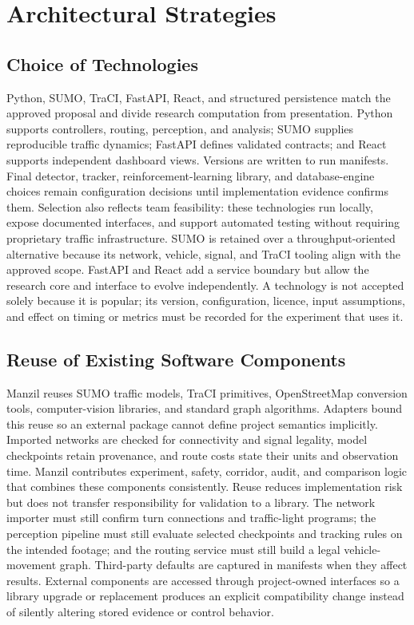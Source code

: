 \section{Architectural Strategies}

\subsection{Choice of Technologies}

Python, SUMO, TraCI, FastAPI, React, and structured persistence match the approved proposal and divide research computation from presentation. Python supports controllers, routing, perception, and analysis; SUMO supplies reproducible traffic dynamics; FastAPI defines validated contracts; and React supports independent dashboard views. Versions are written to run manifests. Final detector, tracker, reinforcement-learning library, and database-engine choices remain configuration decisions until implementation evidence confirms them. Selection also reflects team feasibility: these technologies run locally, expose documented interfaces, and support automated testing without requiring proprietary traffic infrastructure. SUMO is retained over a throughput-oriented alternative because its network, vehicle, signal, and TraCI tooling align with the approved scope. FastAPI and React add a service boundary but allow the research core and interface to evolve independently. A technology is not accepted solely because it is popular; its version, configuration, licence, input assumptions, and effect on timing or metrics must be recorded for the experiment that uses it.

\subsection{Reuse of Existing Software Components}

Manzil reuses SUMO traffic models, TraCI primitives, OpenStreetMap conversion tools, computer-vision libraries, and standard graph algorithms. Adapters bound this reuse so an external package cannot define project semantics implicitly. Imported networks are checked for connectivity and signal legality, model checkpoints retain provenance, and route costs state their units and observation time. Manzil contributes experiment, safety, corridor, audit, and comparison logic that combines these components consistently. Reuse reduces implementation risk but does not transfer responsibility for validation to a library. The network importer must still confirm turn connections and traffic-light programs; the perception pipeline must still evaluate selected checkpoints and tracking rules on the intended footage; and the routing service must still build a legal vehicle-movement graph. Third-party defaults are captured in manifests when they affect results. External components are accessed through project-owned interfaces so a library upgrade or replacement produces an explicit compatibility change instead of silently altering stored evidence or control behavior.

